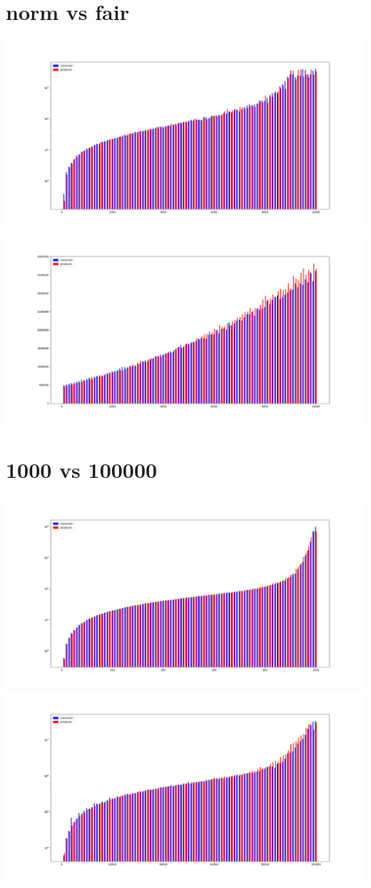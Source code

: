 \documentclass[11pt, a4paper]{article}
\begin{document}
\begin{center}
\section{norm vs fair}
\includegraphics[scale=0.3]{100_100_10000_rand2_norm}
\includegraphics[scale=0.3]{100_100_10000_rand2_fair}

\section{1000 vs 100000}
\includegraphics[scale=0.3]{100_100_1000_rand_norm}
\includegraphics[scale=0.3]{100_100_100000_rand_norm}

\end{center}
\end{document}
